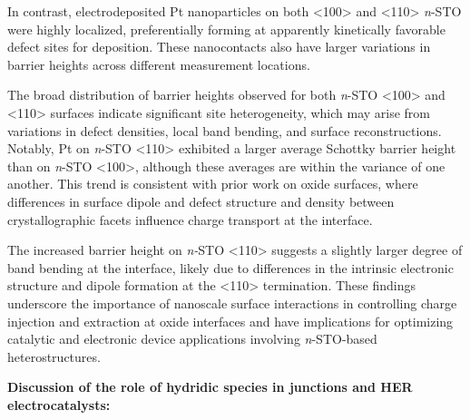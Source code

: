 \documentclass[11pt]{article}
\begin{document}
In contrast, electrodeposited Pt nanoparticles on both
\textless100\textgreater{} and \textless110\textgreater{} \emph{n}-STO
were highly localized, preferentially forming at apparently kinetically
favorable defect sites for deposition. These nanocontacts also have
larger variations in barrier heights across different measurement
locations.

The broad distribution of barrier heights observed for both \emph{n}-STO
\textless100\textgreater{} and \textless110\textgreater{} surfaces
indicate significant site heterogeneity, which may arise from variations
in defect densities, local band bending, and surface reconstructions.
Notably, Pt on \emph{n}-STO \textless110\textgreater{} exhibited a
larger average Schottky barrier height than on \emph{n}-STO
\textless100\textgreater, although these averages are within the
variance of one another. This trend is consistent with prior work on
oxide surfaces, where differences in surface dipole and defect structure
and density between crystallographic facets influence charge transport
at the interface.

The increased barrier height on \emph{n-}STO \textless110\textgreater{}
suggests a slightly larger degree of band bending at the interface,
likely due to differences in the intrinsic electronic structure and
dipole formation at the \textless110\textgreater{} termination. These
findings underscore the importance of nanoscale surface interactions in
controlling charge injection and extraction at oxide interfaces and have
implications for optimizing catalytic and electronic device applications
involving \emph{n}-STO-based heterostructures.

{}
\textbf{Discussion of the role of hydridic species in junctions and HER
electrocatalysts:}
\end{document}
